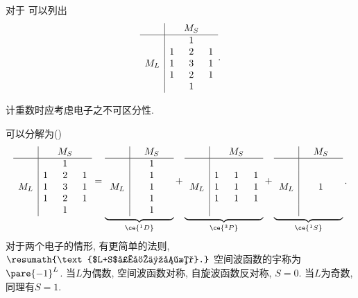 \documentclass[hidelinks]{ctexart}
\begin{document}
对于  可以列出
\[ \begin{array}{c|ccc}
    &   & M_S & \\
    \hline
    &   & 1   & \\
    & 1 & 2   & 1\\
M_L & 1 & 3   & 1\\
    & 1 & 2   & 1\\
    &   & 1   &
\end{array}. \]
\begin{pitfall}
    计重数时应考虑电子之不可区分性.
\end{pitfall}
可以分解为()
\[ \begin{array}{c|ccc}
    &   & M_S & \\
    \hline
    &   & 1   & \\
    & 1 & 2   & 1\\
M_L & 1 & 3   & 1\\
    & 1 & 2   & 1\\
    &   & 1   &
\end{array} = \underbrace{\begin{array}{c|ccc}
    &   & M_S & \\
    \hline
    &   & 1   & \\
    &   & 1   & \\
M_L &   & 1   & \\
    &   & 1   & \\
    &   & 1   &
\end{array}}_{\ce{^1D}} + \underbrace{\begin{array}{c|ccc}
    &   & M_S & \\
    \hline
    &   &     & \\
    & 1 & 1   & 1 \\
M_L & 1 & 1   & 1 \\
    & 1 & 1   & 1 \\
    &   &     &
\end{array}}_{\ce{^3P}} + \underbrace{\begin{array}{c|ccc}
    &   & M_S & \\
    \hline
    &   &     & \\
    &   &     &   \\
M_L &   & 1   &   \\
    &   &     &   \\
    &   &     &
\end{array}}_{\ce{^1S}}. \]
对于两个电子的情形, 有更简单的法则, $\resumath{\text{$L+S$必定为偶数}.}$ 空间波函数的宇称为$\pare{-1}^L$. 当$L$为偶数, 空间波函数对称, 自旋波函数反对称, $S=0$. 当$L$为奇数, 同理有$S=1$.
\end{document}
